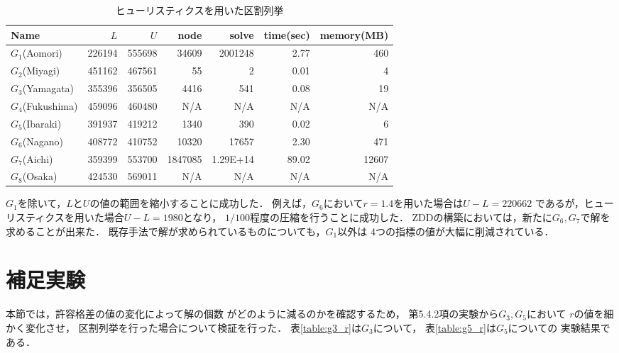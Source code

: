 \begin{table}[htbp]
  \caption{ヒューリスティクスを用いた区割列挙}
  \label{out_h}
  \centering
  \begin{tabular}{l||r|r||r|r|r|r}
    \hline
    Name & $L$ & $U$ & node & solve & time(sec) & memory(MB) \\
    \hline \hline
    $G_1$(Aomori) & 226194 & 555698 & 34609 & 2001248 & 2.77 & 460 \\
    $G_2$(Miyagi) & 451162 & 467561 & 55 & 2 & 0.01 & 4 \\
    $G_3$(Yamagata) & 355396 & 356505 & 4416 & 541 & 0.08 & 19 \\
    $G_4$(Fukushima) & 459096 & 460480 & N/A & N/A & N/A & N/A \\
    $G_5$(Ibaraki) & 391937 & 419212 & 1340 & 390 & 0.02 & 6 \\
    $G_6$(Nagano) & 408772 & 410752 & 10320 & 17657 & 2.30 & 471 \\
    $G_7$(Aichi) & 359399 & 553700 & 1847085 & 1.29E+14 & 89.02 & 12607 \\
    $G_8$(Osaka) & 424530 & 569011 & N/A & N/A & N/A & N/A \\
    \hline
  \end{tabular}
\end{table}

$G_1$を除いて，$L$と$U$の値の範囲を縮小することに成功した．
例えば，$G_6$において$r=1.4$を用いた場合は$U-L=220662$
であるが，ヒューリスティクスを用いた場合$U-L=1980$となり，
$1/100$程度の圧縮を行うことに成功した．
ZDDの構築においては，新たに$G_6, G_7$で解を求めることが出来た．
既存手法で解が求められているものについても，$G_1$以外は
4つの指標の値が大幅に削減されている．

\section{補足実験}

本節では，許容格差の値の変化によって解の個数
がどのように減るのかを確認するため，
第5.4.2項の実験から$G_3, G_5$において
$r$の値を細かく変化させ，
区割列挙を行った場合について検証を行った．
表\ref{table:g3_r}は$G_3$について，
表\ref{table:g5_r}は$G_5$についての
実験結果である．

